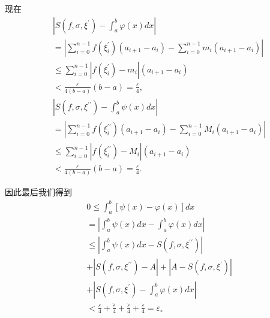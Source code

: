 现在
\begin{align*}
	&\left| {S\left( {f,\sigma ,{\xi }^{\prime }}\right)  - {\int }_{a}^{b}\varphi \left( x\right) {dx}}\right|\\
	&= \left| {\mathop{\sum }\limits_{{i = 0}}^{{n - 1}}f\left( {\xi }_{i}^{\prime }\right) \left( {{a}_{i + 1} - {a}_{i}}\right)  - \mathop{\sum }\limits_{{i = 0}}^{{n - 1}}{m}_{i}\left( {{a}_{i + 1} - {a}_{i}}\right) }\right|\\
	&\leq  \mathop{\sum }\limits_{{i = 0}}^{{n - 1}}\left| {f\left( {\xi }_{i}^{\prime }\right)  - {m}_{i}}\right| \left( {{a}_{i + 1} - {a}_{i}}\right)\\
	&< \frac{\varepsilon }{4\left( {b - a}\right) }\left( {b - a}\right)  = \frac{\varepsilon }{4},\\
	&\left| {S\left( {f,\sigma ,{\xi }^{\prime \prime }}\right)  - {\int }_{a}^{b}\psi \left( x\right) {dx}}\right|\\
	&= \left| {\mathop{\sum }\limits_{{i = 0}}^{{n - 1}}f\left( {\xi }_{i}^{\prime \prime }\right) \left( {{a}_{i + 1} - {a}_{i}}\right)  - \mathop{\sum }\limits_{{i = 0}}^{{n - 1}}{M}_{i}\left( {{a}_{i + 1} - {a}_{i}}\right) }\right|\\
	&\leq  \mathop{\sum }\limits_{{i = 0}}^{{n - 1}}\left| {f\left( {\xi }_{i}^{\prime \prime }\right)  - {M}_{i}}\right| \left( {{a}_{i + 1} - {a}_{i}}\right)\\
	&< \frac{\varepsilon }{4\left( {b - a}\right) }\left( {b - a}\right)  = \frac{\varepsilon }{4}.
\end{align*}

因此最后我们得到
\begin{align*}
	&0 \leq  {\int }_{a}^{b}\left\lbrack  {\psi \left( x\right)  - \varphi \left( x\right) }\right\rbrack  {dx}\\
	&= \left| {{\int }_{a}^{b}\psi \left( x\right) {dx} - {\int }_{a}^{b}\varphi \left( x\right) {dx}}\right|\\
	&\leq  \left| {{\int }_{a}^{b}\psi \left( x\right) {dx} - S\left( {f,\sigma ,{\xi }^{\prime \prime }}\right) }\right|\\
	&+ \left| {S\left( {f,\sigma ,{\xi }^{\prime \prime }}\right)  - A}\right|  + \left| {A - S\left( {f,\sigma ,{\xi }^{\prime }}\right) }\right|\\
	&+ \left| {S\left( {f,\sigma ,{\xi }^{\prime }}\right)  - {\int }_{a}^{b}\varphi \left( x\right) {dx}}\right|\\
	&< \frac{\varepsilon }{4} + \frac{\ddot{\varepsilon }}{4} + \frac{\ddot{\varepsilon }}{4} + \frac{\dot{\varepsilon }}{4} = {\varepsilon }_{ \circ  }
\end{align*}


